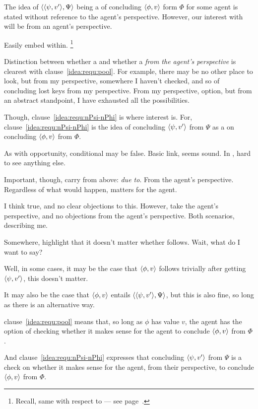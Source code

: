 \begin{note}
  The idea of \(\langle \langle \psi, v' \rangle, \Psi \rangle\) being a  of concluding \(\langle \phi, v \rangle\) form \(\Phi\) for some agent is stated without reference to the agent's perspective.
  However, our interest with  will be from an agent's perspective.

  Easily embed within.%
  \footnote{
    Recall, same with respect to  --- see page~\pageref{fcs-neutral-perspective}.
  }

  Distinction between whether a \requ{} and whether a \requ{} \emph{from the agent's perspective} is clearest with clause~\ref{idea:requ:pool}.
  For example, there may be no other place to look, but from my perspective, somewhere I haven't checked, and so \requ{} of concluding lost keys from my perspective.
  From my perspective, option, but from an abstract standpoint, I have exhausted all the possibilities.

  Though, clause~\ref{idea:requ:nPsi-nPhi} is where interest is.
  For, clause~\ref{idea:requ:nPsi-nPhi} is the idea of concluding \(\langle \psi, v' \rangle\) from \(\Psi\) as a \emph{} on concluding \(\langle \phi, v \rangle\) from \(\Phi\).

  As with opportunity, conditional may be false.
  Basic link, seems sound.
  In , hard to see anything else.

  Important, though, carry from above: \emph{due to}.
  From the agent's perspective.
  Regardless of what would happen, matters for the agent.

  I think true, and no clear objections to this.
  However, take the agent's perspective, and no objections from the agent's perspective.
  Both scenarios, describing me.
\end{note}

\begin{note}
  \color{red}
  Somewhere, highlight that it doesn't matter whether \requ{} follows.
  Wait, what do I want to say?

  Well, in some cases, it may be the case that \(\langle \phi, v \rangle\) follows trivially after getting \(\langle \psi, v' \rangle\), this doesn't matter.

  It may also be the case that \(\langle \phi, v \rangle\) entails \(\langle \langle \psi, v' \rangle, \Psi \rangle\), but this is also fine, so long as there is an alternative way.
\end{note}

\begin{note}
  \color{red}
  clause~\ref{idea:requ:pool} means that, so long as \(\phi\) has value \(v\), the agent has the option of checking whether it makes sense for the agent to conclude \(\langle \phi, v \rangle\) from \(\Phi\).

  And clause~\ref{idea:requ:nPsi-nPhi} expresses that concluding \(\langle \psi, v' \rangle\) from \(\Psi\) is a check on whether it makes sense for the agent, from their perspective, to conclude \(\langle \phi, v \rangle\) from \(\Phi\).
\end{note}

